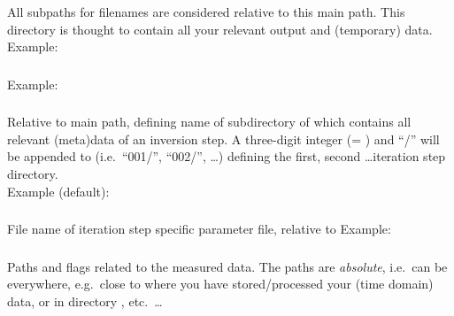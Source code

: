 \subsubsection{} \label{files,sec:main_parfile,itm:main_path}
All subpaths for filenames are considered relative to this main path. This
directory is thought to contain all your relevant output and (temporary) data.\\
Example: 
\subsubsection{} \label{files,sec:main_parfile,itm:cur_iter_step}
Example: 
\subsubsection{} \label{files,sec:main_parfile,itm:iter_path}
Relative to main path, defining name of subdirectory of  which contains 
all relevant (meta)data of an inversion step. A three-digit integer (= ) 
and ``/'' will be appended to  (i.e.\ ``001/'', ``002/'', \dots) defining the 
first, second \dots iteration step directory.\\
Example (default): 
\subsubsection{} \label{files,sec:main_parfile,itm:iter_parfile}
File name of iteration step specific parameter file, relative to 
Example: 
\subsubsection{} 
\label{files,sec:main_parfile,itm:path_mdata_filters}
Paths and flags related to the measured data. The paths are \emph{absolute}, i.e.\ can be everywhere, 
e.g.\ close to where you 
have stored/processed your (time domain) data, or in directory , etc.\ \dots

